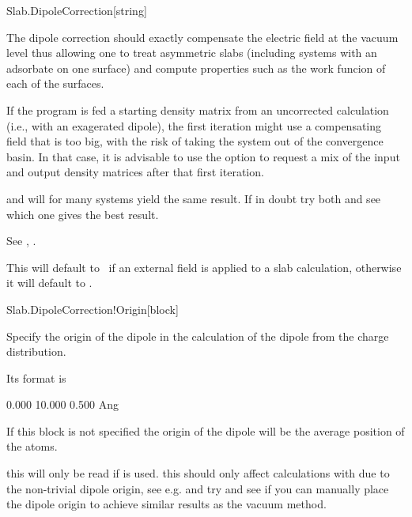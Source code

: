 \begin{fdfentry}{Slab.DipoleCorrection}[string]
\begin{fdfoptions}
    \end{fdfoptions}
  
    The dipole correction should exactly compensate the electric field
    at the vacuum level thus allowing one to treat asymmetric slabs
    (including systems with an adsorbate on one surface) and compute
    properties such as the work funcion of each of the surfaces.
  
    \note If the program is fed a starting density matrix from an
    uncorrected calculation (i.e., with an exagerated dipole), the first
    iteration might use a compensating field that is too big, with the
    risk of taking the system out of the convergence basin. In that
    case, it is advisable to use the  option to request a mix of the input and
    output density matrices after that first iteration.
  
    \note {} and  will for many systems yield
    the same result. If in doubt try both and see which one gives the
    best result.
  
    See , .
  
    This will default to \fdftrue\ if an external field is applied to a
    slab calculation, otherwise it will default to \fdffalse.
  
  \end{fdfentry}
  
  \begin{fdfentry}{Slab.DipoleCorrection!Origin}[block]
  
    Specify the origin of the dipole in the calculation of the dipole
    from the charge distribution.
  
    Its format is
    \begin{fdfexample}
          0.000  10.000  0.500  Ang
    \end{fdfexample}
  
    If this block is not specified the origin of the dipole will be the
    average position of the atoms.
  
    \note this will only be read if 
    is used.
    \note this should only affect calculations with
     due to the non-trivial dipole origin, see
    e.g.  and try and see if you can
    manually place the dipole origin to achieve similar results as the
    vacuum method.
  
  \end{fdfentry}
  
